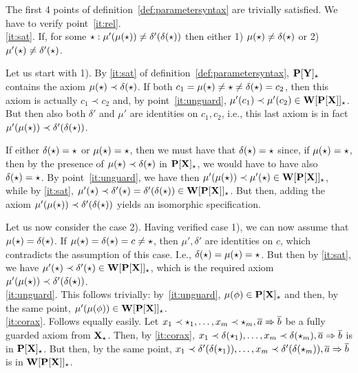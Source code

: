 \begin{PROOF}
The first 4 points of definition~\ref{def:parametersyntax} are trivially
satisfied. We have to verify point~\ref{it:rel}. 
\\[1ex]
\ref{it:sat}. 
If, for some $\star:\mu'(\mu(\star))\not=\delta'(\delta(\star))$ then either 1)
$\mu(\star)\not=\delta(\star)$ or 2)
$\mu'(\star)\not=\delta'(\star)$. 

Let us start with 1). By \ref{it:sat} of
definition~\ref{def:parametersyntax}, ${\bf P[Y]_\star}$ contains the axiom
$\mu(\star)\prec\delta(\star)$. If both
$c_1=\mu(\star)\not=\star\not=\delta(\star)=c_2$, then this axiom is actually
$c_1\prec c_2$ and,  by point~\ref{it:unguard}, 
$\mu'(c_1)\prec\mu'(c_2)\in{\bf W[P[X]]_\star}$. But then also both $\delta'$ and
$\mu'$ are identities on $c_1,c_2$, i.e., this last axiom is in fact
$\mu'(\mu(\star))\prec \delta'(\delta(\star))$. 

If either $\delta(\star)=\star$ or $\mu(\star)=\star$, then we must have that
$\delta(\star)=\star$ since, if  $\mu(\star)=\star$, then by the presence of
$\mu(\star)\prec\delta(\star)$ in ${\bf P[X]_\star}$, we would have to have also
$\delta(\star)=\star$. By point~\ref{it:unguard}, we have then
$\mu'(\mu(\star))\prec \mu'(\star)\in{\bf W[P[X]]_\star}$, while by
\ref{it:sat}, $\mu'(\star)\prec \delta'(\star)=\delta'(\delta(\star))\in{\bf W[P[X]]_\star}$. But
then, adding the axiom $\mu'(\mu(\star))\prec\delta'(\delta(\star))$ yields
an isomorphic specification. 

Let us now consider the case 2). Having verified case 1), we can now assume that
$\mu(\star)=\delta(\star)$. If $\mu(\star)=\delta(\star)=c\not=\star$, then
$\mu',\delta'$ are identities on $c$, which contradicts the assumption of
this case. I.e., $\delta(\star)=\mu(\star)=\star$. But then by \ref{it:sat},
we have $\mu'(\star)\prec\delta'(\star)\in{\bf W[P[X]]_\star}$, which is the
required axiom $\mu'(\mu(\star))\prec\delta'(\delta(\star))$. 
\\[1ex]
\ref{it:unguard}. 
This follows trivially: by~\ref{it:unguard},
$\mu(\phi)\in{\bf P[X]_\star}$ and then, by the same point,
$\mu'(\mu(\phi))\in{\bf W[P[X]]_\star}$. 
\\[1ex]
\ref{it:corax}. Follows equally easily. Let 
$x_1\prec\star_1, \ldots ,x_m\prec\star_m, \overline{a} \Rightarrow \overline{b}$ be a fully
guarded axiom from ${\bf X_\star}$. Then, by \ref{it:corax}, 
$x_1\prec\delta(\star_1), \ldots ,x_m\prec\delta(\star_m), \overline{a} \Rightarrow
\overline{b}$ is in ${\bf P[X]_\star}$. But then, by the same point, 
$x_1\prec\delta'(\delta(\star_1)), \ldots ,x_m\prec\delta'(\delta(\star_m)),
\overline{a} \Rightarrow \overline{b}$ is in ${\bf W[P[X]]_\star}$. 
\end{PROOF}\vspace*{-3ex}

